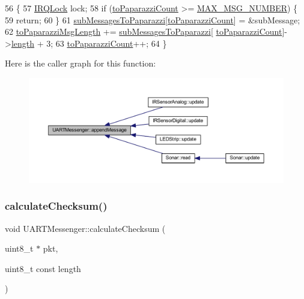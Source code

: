 \begin{DoxyCode}
56                                                               \{
57     \hyperlink{class_i_r_q_lock}{IRQLock} lock;
58     \textcolor{keywordflow}{if} (\hyperlink{class_u_a_r_t_messenger_ae47f334cdd266ae4cde0715154f0ace3}{toPaparazziCount} >= \hyperlink{_u_a_r_t_messenger_8h_a6274d6c4801975be4baacd279386909d}{MAX\_MSG\_NUMBER}) \{
59         \textcolor{keywordflow}{return};
60     \}
61     \hyperlink{class_u_a_r_t_messenger_a1caaef4e6d8fa5005cd8ea5ff4937369}{subMessagesToPaparazzi}[\hyperlink{class_u_a_r_t_messenger_ae47f334cdd266ae4cde0715154f0ace3}{toPaparazziCount}] = &subMessage;
62     \hyperlink{class_u_a_r_t_messenger_ae2a77be89a1f84b466eab4753929b902}{toPaparazziMsgLength} += \hyperlink{class_u_a_r_t_messenger_a1caaef4e6d8fa5005cd8ea5ff4937369}{subMessagesToPaparazzi}[
      \hyperlink{class_u_a_r_t_messenger_ae47f334cdd266ae4cde0715154f0ace3}{toPaparazziCount}]->\hyperlink{struct_sub_message_a276e06f5335ca7857c21ac8c0e51bd6d}{length} + 3;
63     \hyperlink{class_u_a_r_t_messenger_ae47f334cdd266ae4cde0715154f0ace3}{toPaparazziCount}++;
64 \}
\end{DoxyCode}
Here is the caller graph for this function\+:\nopagebreak
\begin{figure}[H]
\begin{center}
\leavevmode
\includegraphics[width=350pt]{class_u_a_r_t_messenger_ada0967869e320c236a211b405abf128a_icgraph}
\end{center}
\end{figure}
\mbox{\label{class_u_a_r_t_messenger_a21e6194acf3039eafdbb4e4c3b7876a3}} 
\subsubsection{\texorpdfstring{calculate\+Checksum()}{calculateChecksum()}}
{\footnotesize\ttfamily void U\+A\+R\+T\+Messenger\+::calculate\+Checksum (\begin{DoxyParamCaption}\item[{uint8\+\_\+t $\ast$}]{pkt,  }\item[{uint8\+\_\+t const}]{length }\end{DoxyParamCaption})\hspace{0.3cm}{\ttfamily [private]}}



